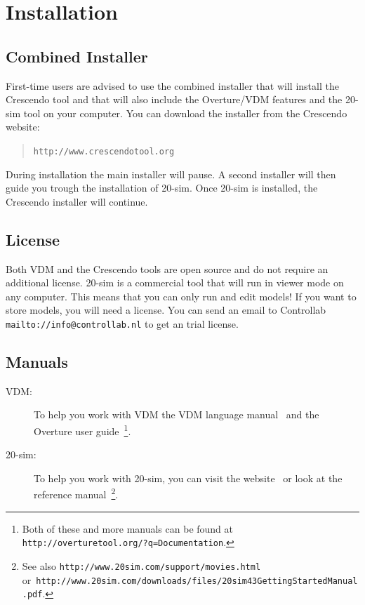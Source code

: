 \documentclass{crescendorepchap}
\newcommand{\url}[1]{\texttt{#1}}
\begin{document}
\section{Installation}\label{sec:install}

\subsection{Combined Installer}

First-time users are advised to use the combined installer that will
install the Crescendo tool and that will also include the Overture/VDM features and the 20-sim tool on your computer. You can
download the installer from the Crescendo website:

\begin{quote}
\url{http://www.crescendotool.org}
\end{quote}

During installation the main installer will pause. A second installer
will then guide you trough the installation of 20-sim. Once 20-sim is
installed, the Crescendo installer will continue.

\subsection{License}

Both VDM and the Crescendo tools are open source and do not require an
additional license. 20-sim is a commercial tool that will run in
viewer mode on any computer. This means that you
can only run and edit models! If you want to store models, you will need
a license. You can send an email to
Controllab \url{mailto://info@controllab.nl} to get an trial license.

\subsection{Manuals}

\begin{description}
\item[VDM:] To help you work with VDM the VDM language manual~\cite{Larsen&13b} and the Overture user guide~\cite{Larsen&13a}\footnote{Both of these and more manuals can be found at
  \url{http://overturetool.org/?q=Documentation}.}.
\item[20-sim:] To help you work with 20-sim, you can visit the
  website~\cite{20sim} or look at the reference
  manual~\cite{Kleijn09}\footnote{See also
    \url{http://www.20sim.com/support/movies.html}
    or~\url{http://www.20sim.com/downloads/files/20sim43GettingStartedManual.pdf}.}.
\end{description}
\end{document}
